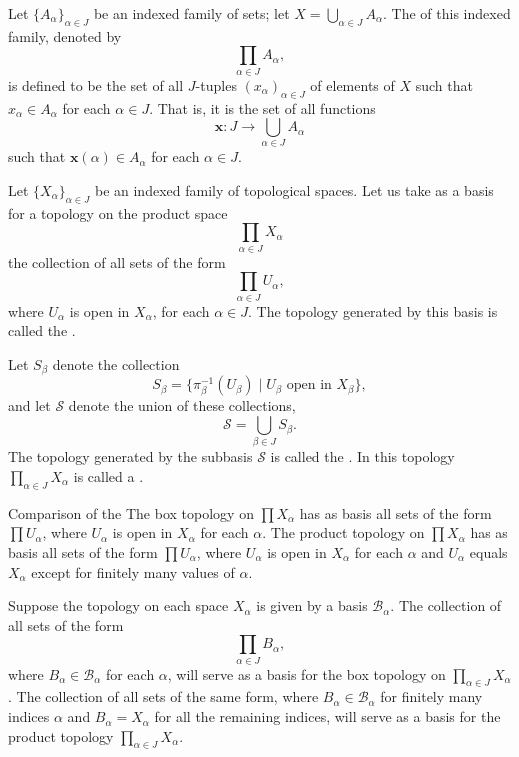 \documentclass[../main.tex]{subfiles}
\begin{document}
\begin{definition}{}{}
Let $\{A_{\alpha}\}_{\alpha \in J}$ be an indexed family of sets; let $X = \bigcup_{\alpha \in J} A_{\alpha}$. The  of this indexed family, denoted by
\[ \prod_{\alpha \in J} A_{\alpha}, \]
is defined to be the set of all $J$-tuples $(x_{\alpha})_{\alpha \in J}$ of elements of $X$ such that $x_{\alpha} \in A_{\alpha}$ for each $\alpha \in J$. That is, it is the set of all functions
\[ \mathbf{x} : J \to \bigcup_{\alpha \in J} A_{\alpha} \]
such that $\mathbf{x}(\alpha) \in A_{\alpha}$ for each $\alpha \in J$.
\end{definition}
\begin{definition}{}{}
Let $\{X_{\alpha}\}_{\alpha \in J}$ be an indexed family of topological spaces. Let us take as a basis for a topology on the product space
\[ \prod_{\alpha \in J} X_{\alpha} \]
the collection of all sets of the form
\[ \prod_{\alpha \in J} U_{\alpha}, \]
where $U_{\alpha}$ is open in $X_{\alpha}$, for each $\alpha \in J$. The topology generated by this basis is called the .
\end{definition}
\begin{definition}{}{}
Let $S_{\beta}$ denote the collection
\[
S_{\beta} = \{\pi_{\beta}^{-1}(U_{\beta}) \mid U_{\beta} \text{ open in } X_{\beta}\},
\]
and let $\mathcal{S}$ denote the union of these collections,
\[
\mathcal{S} = \bigcup_{\beta \in J} S_{\beta}.
\]
The topology generated by the subbasis $\mathcal{S}$ is called the . In this topology $\prod_{\alpha \in J} X_{\alpha}$ is called a .
\end{definition}
\begin{theorem}{Comparison of the }{}
The box topology on $\prod X_{\alpha}$ has as basis all sets of the form $\prod U_{\alpha}$, where $U_{\alpha}$ is open in $X_{\alpha}$ for each $\alpha$. The product topology on $\prod X_{\alpha}$ has as basis all sets of the form $\prod U_{\alpha}$, where $U_{\alpha}$ is open in $X_{\alpha}$ for each $\alpha$ and $U_{\alpha}$ equals $X_{\alpha}$ except for finitely many values of $\alpha$.
\end{theorem}
\begin{theorem}{}{}
Suppose the topology on each space $X_{\alpha}$ is given by a basis $\mathcal{B}_{\alpha}$. The collection of all sets of the form
\[
\prod_{\alpha \in J} B_{\alpha},
\]
where $B_{\alpha} \in \mathcal{B}_{\alpha}$ for each $\alpha$, will serve as a basis for the box topology on $\prod_{\alpha \in J} X_{\alpha}$.
The collection of all sets of the same form, where $B_{\alpha} \in \mathcal{B}_{\alpha}$ for finitely many indices $\alpha$ and $B_{\alpha} = X_{\alpha}$ for all the remaining indices, will serve as a basis for the product topology $\prod_{\alpha \in J} X_{\alpha}$.
\end{theorem}
\end{document}
